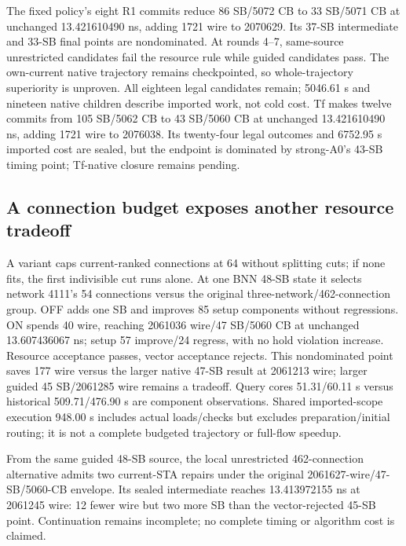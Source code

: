 \documentclass[conference,10pt]{IEEEtran}
\begin{document}
The fixed policy's eight R1 commits reduce 86 SB/5072 CB to 33 SB/5071 CB at unchanged 13.421610490 ns, adding 1721 wire to 2070629. Its 37-SB intermediate and 33-SB final points are nondominated. At rounds 4--7, same-source unrestricted candidates fail the resource rule while guided candidates pass. The own-current native trajectory remains checkpointed, so whole-trajectory superiority is unproven. All eighteen legal candidates remain; 5046.61 s and nineteen native children describe imported work, not cold cost. Tf makes twelve commits from 105 SB/5062 CB to 43 SB/5060 CB at unchanged 13.421610490 ns, adding 1721 wire to 2076038. Its twenty-four legal outcomes and 6752.95 s imported cost are sealed, but the endpoint is dominated by strong-A0's 43-SB timing point; Tf-native closure remains pending.

\subsection{A connection budget exposes another resource tradeoff}
A variant caps current-ranked connections at 64 without splitting cuts; if none fits, the first indivisible cut runs alone. At one BNN 48-SB state it selects network 4111's 54 connections versus the original three-network/462-connection group. OFF adds one SB and improves 85 setup components without regressions. ON spends 40 wire, reaching 2061036 wire/47 SB/5060 CB at unchanged 13.607436067 ns; setup 57 improve/24 regress, with no hold violation increase. Resource acceptance passes, vector acceptance rejects. This nondominated point saves 177 wire versus the larger native 47-SB result at 2061213 wire; larger guided 45 SB/2061285 wire remains a tradeoff. Query cores 51.31/60.11 s versus historical 509.71/476.90 s are component observations. Shared imported-scope execution 948.00 s includes actual loads/checks but excludes preparation/initial routing; it is not a complete budgeted trajectory or full-flow speedup.

From the same guided 48-SB source, the local unrestricted 462-connection alternative admits two current-STA repairs under the original 2061627-wire/47-SB/5060-CB envelope. Its sealed intermediate reaches 13.413972155 ns at 2061245 wire: 12 fewer wire but two more SB than the vector-rejected 45-SB point. Continuation remains incomplete; no complete timing or algorithm cost is claimed.
\end{document}
